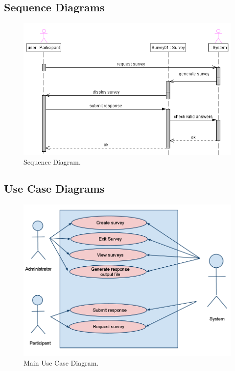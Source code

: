 \documentclass[a4paper,12pt,oneside]{report}
\begin{document}
\pagebreak

\subsection{Sequence Diagrams}

\begin{figure}[!hp]
  \begin{center}
   \includegraphics[width=15cm]{pics/Sequence.png}
  \end{center}
\caption{Sequence Diagram.}
\end{figure}

\pagebreak
\subsection{Use Case Diagrams}

\begin{figure}[h!]
  \begin{center}
   \includegraphics[width=14cm]{pics/usecase.png}
  \end{center}
\caption{Main Use Case Diagram.}
\end{figure}
\end{document}

